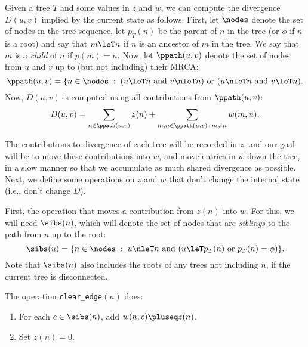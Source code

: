 Given a tree $T$ and some values in $z$ and $w$,
we can compute the divergence $D(u, v)$ implied by the current state as follows.
%
First, let $\nodes$ denote the set of nodes in the tree sequence,
let $p_T(n)$ be the parent of $n$ in the tree (or $\phi$ if $n$ is a root)
and say that $m \leT n$ if $n$ is an ancestor of $m$ in the tree.
%
We say that $m$ is a \emph{child} of $n$ if $p(m) = n$.
%
Now, let $\ppath(u, v)$ denote the set of nodes from $u$ and $v$ up to (but not including) their MRCA:
%
$$
    \ppath(u, v) = \{ n \in \nodes \;:\;
    (u \leT n \text{ and } v \nleT n )
    \text{ or }
    (u \nleT n \text{ and } v \leT n ) .
$$
%
Now, $D(u, v)$ is computed using all contributions from $\ppath(u, v)$:
%
\begin{align} \label{defn:D}
    D(u, v)
    =
    \sum_{n \in \ppath(u, v)} z(n)
    +
    \sum_{m, n \in \ppath(u, v) \,:\, m \neq n } w(m, n) .
\end{align}

The contributions to divergence of each tree will be recorded in $z$,
and our goal will be to move these contributions into $w$,
and move entries in $w$ down the tree,
in a slow manner so that we accumulate as much shared divergence as possible.
%
Next, we define some operations on $z$ and $w$
that don't change the internal state (i.e., don't change $D$).

First, the operation that moves a contribution from $z(n)$ into $w$.
%
For this, we will need $\sibs(n)$,
which will denote the set of nodes that are \emph{siblings} to the path from $n$ up to the root:
%
$$
    \sibs(u) = \{
        n \in \nodes \; : \;
        u \nleT n \text{ and }
        (
            u \leT p_T(n)
            \text{ or }
            p_T(n) = \phi
        )
    \} .
$$
%
Note that $\sibs(n)$ also includes the roots of any trees not including $n$,
if the current tree is disconnected.

\begin{definition}
The operation \texttt{clear\_edge}$(n)$ does:
\begin{enumerate}
    \item For each $c \in \sibs(n)$, add $w(n, c) \pluseq z(n)$.
    \item Set $z(n) = 0$.
\end{enumerate}
\end{definition}

